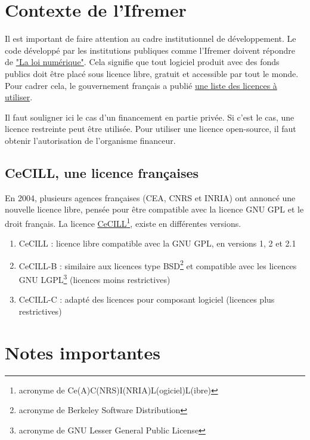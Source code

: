 \documentclass[12pt, colorinlistoftodos]{article}
\begin{document}
\section{Contexte de l'Ifremer}

Il est important de faire attention au cadre institutionnel de développement.
Le code développé par les institutions publiques comme l'Ifremer doivent répondre de 
\href{https://www.legifrance.gouv.fr/loda/article_lc/LEGIARTI000033205142/2020-09-21/}{"La loi numérique"}.
Cela signifie que tout logiciel produit avec des fonds publics doit être placé sous licence libre, 
gratuit et accessible par tout le monde.
Pour cadrer cela, le gouvernement français a publié
\href{https://www.data.gouv.fr/fr/pages/legal/licences/}{une liste des licences à utiliser}.

Il faut souligner ici le cas d'un financement en partie privée.
Si c'est le cas, une licence restreinte peut être utilisée.
Pour utiliser une licence open-source, il faut obtenir l'autorisation de l'organisme financeur.

\subsection*{CeCILL, une licence françaises}

En 2004, plusieurs agences françaises (CEA, CNRS et INRIA) ont annoncé une nouvelle licence libre, 
pensée pour être compatible avec la licence GNU GPL et le droit français.
La licence \href{https://cecill.info/index.fr.html}{CeCILL}\footnote{acronyme de Ce(A)C(NRS)I(NRIA)L(ogiciel)L(ibre)}, existe en différentes versions.

\begin{enumerate}
    \item CeCILL : licence libre compatible avec la GNU GPL, en versions 1, 2 et 2.1
    \item CeCILL-B : similaire aux licences type BSD\footnote{acronyme de Berkeley Software Distribution} et compatible avec les licences GNU LGPL\footnote{acronyme de GNU Lesser General Public License} (licences moins restrictives)
    \item CeCILL-C : adapté des licences pour composant logiciel (licences plus restrictives)
\end{enumerate}

\section{Notes importantes}
\end{document}

